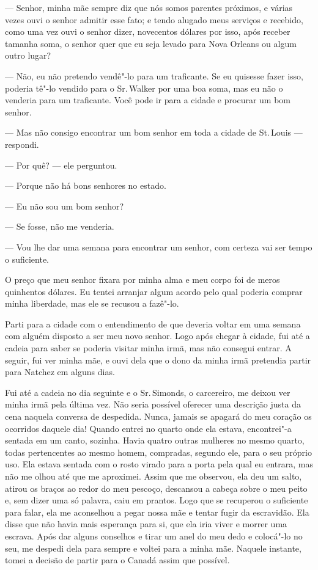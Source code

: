 --- Senhor, minha mãe sempre diz que nós somos parentes próximos, e
várias vezes ouvi o senhor admitir esse fato; e tendo alugado meus
serviços e recebido, como uma vez ouvi o senhor dizer, novecentos
dólares por isso, após receber tamanha soma, o senhor quer que eu seja
levado para Nova Orleans ou algum outro lugar?

--- Não, eu não pretendo vendê"-lo para um traficante. Se eu quisesse
fazer isso, poderia tê"-lo vendido para o Sr.\,Walker por uma boa soma,
mas eu não o venderia para um traficante. Você pode ir para a cidade e
procurar um bom senhor.

--- Mas não consigo encontrar um bom senhor em toda a cidade de St.\,Louis --- respondi.

--- Por quê? --- ele perguntou.

--- Porque não há bons senhores no estado.

--- Eu não sou um bom senhor?

--- Se fosse, não me venderia.

--- Vou lhe dar uma semana para encontrar um senhor, com certeza vai ser
tempo o suficiente.

O preço que meu senhor fixara por minha alma e meu corpo foi de meros
quinhentos dólares. Eu tentei arranjar algum acordo pelo qual poderia
comprar minha liberdade, mas ele se recusou a fazê"-lo.

Parti para a cidade com o entendimento de que deveria voltar em uma
semana com alguém disposto a ser meu novo senhor. Logo após chegar à
cidade, fui até a cadeia para saber se poderia visitar minha irmã, mas
não consegui entrar. A seguir, fui ver minha mãe, e ouvi dela que o dono
da minha irmã pretendia partir para Natchez em alguns dias.

Fui até a cadeia no dia seguinte e o Sr.\,Simonds, o carcereiro, me
deixou ver minha irmã pela última vez. Não seria possível oferecer uma
descrição justa da cena naquela conversa de despedida. Nunca, jamais se
apagará do meu coração os ocorridos daquele dia! Quando entrei no quarto
onde ela estava, encontrei"-a sentada em um canto, sozinha. Havia quatro
outras mulheres no mesmo quarto, todas pertencentes ao mesmo homem,
compradas, segundo ele, para o seu próprio uso. Ela estava sentada com o
rosto virado para a porta pela qual eu entrara, mas não me olhou até que
me aproximei. Assim que me observou, ela deu um salto, atirou os braços
ao redor do meu pescoço, descansou a cabeça sobre o meu peito e, sem
dizer uma só palavra, caiu em prantos. Logo que se recuperou o
suficiente para falar, ela me aconselhou a pegar nossa mãe e tentar
fugir da escravidão. Ela disse que não havia mais esperança para si, que
ela iria viver e morrer uma escrava. Após dar alguns conselhos e tirar
um anel do meu dedo e colocá"-lo no seu, me despedi dela para sempre e
voltei para a minha mãe. Naquele instante, tomei a decisão de partir
para o Canadá assim que possível.

